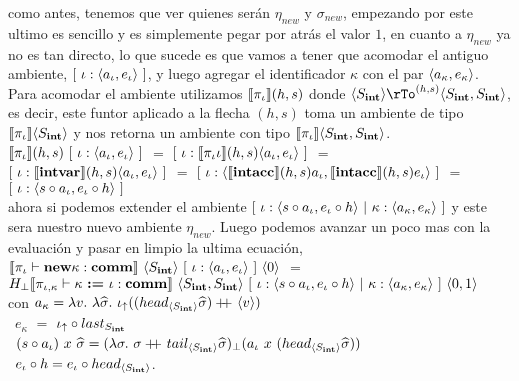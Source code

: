 como antes, tenemos que ver quienes ser\'an $\eta_{new}$ y $\sigma_{new}$, empezando por
este ultimo es sencillo y es simplemente pegar por atr\'as el valor $1$, en cuanto a
$\eta_{new}$ ya no es tan directo, lo que sucede es que vamos a tener que acomodar el
antiguo ambiente, $[ \ \iota : \langle a_\iota,e_\iota \rangle \ ]$, y luego agregar
el identificador $\kappa$ con el par $\langle a_\kappa,e_\kappa \rangle$.\\
Para acomodar el ambiente utilizamos 
$\llbracket \pi_\iota \rrbracket(h,s)$ donde $\lrangles{S_\intt} \rTo^{(h,s)} \lrangles{S_\intt,S_\intt}$,
es decir, este funtor aplicado a la flecha $(h,s)$ toma un ambiente de tipo
$\llbracket \pi_\iota \rrbracket\langle S_{\textbf{int}} \rangle$ y nos retorna un ambiente con tipo 
$\llbracket \pi_\iota \rrbracket\langle S_{\textbf{int}},S_{\textbf{int}} \rangle$.\\

$\llbracket \pi_\iota \rrbracket(h,s) \ [ \ \iota : \langle a_\iota,e_\iota \rangle \ ]$ $=$
$[ \ \iota : \llbracket \pi_\iota \iota \rrbracket(h,s) \langle a_\iota,e_\iota \rangle \ ]$ $=$\\

\indent
$[ \ \iota : \llbracket \textbf{intvar} \rrbracket(h,s) \langle a_\iota,e_\iota \rangle \ ]$ $=$
$[ \ \iota : \langle \llbracket \textbf{intacc} \rrbracket(h,s) a_\iota,\llbracket \textbf{intacc} \rrbracket(h,s)e_\iota \rangle \ ]$ $=$\\

\indent
$[ \ \iota : \langle s \circ a_\iota,e_\iota \circ h \rangle \ ]$\\

ahora si podemos extender el ambiente 
$[ \ \iota : \lrangles{s \circ a_\iota,e_\iota \circ h} \ | \
	\kappa : \lrangles{a_\kappa,e_\kappa}\ ]$ y este sera nuestro nuevo ambiente $\eta_{new}$.
Luego podemos avanzar un poco mas con la evaluaci\'on y pasar en limpio la ultima ecuaci\'on,\\

\noindent
$\semBrcks{\pi_\iota \vdash \cnew \kappa : \commt}
	\ \lrangles{S_\intt} \ 
	[ \ \iota : \lrangles{a_\iota,e_\iota} \ ] \ \lrangles{0}$ $=$ \\
	\indent 
	$H_{\bot} 
	\llbracket \pi_{\iota,\kappa} \vdash \kappa \ \textbf{:=} \ \iota: \textbf{comm} \rrbracket
		\ \langle S_{\textbf{int}},S_{\textbf{int}} \rangle
		\ [ \ \iota : \langle s \circ a_\iota,e_\iota \circ h \rangle \ | \
			\kappa : \langle a_\kappa,e_\kappa \rangle\ ] 
		\ \langle 0,1 \rangle$\\

con $a_\kappa = \lambda v. \ \lambda \widehat{\sigma} . \ \iota_{\uparrow} 
				((head_{\langle S_{\textbf{int}} \rangle} \widehat{\sigma}) +\kern-1.3ex+\kern0.8ex \langle v \rangle)$\\
\indent \indent \ 
	$e_\kappa$ $=$ $ \iota_{\uparrow} \circ last_{S_{\textbf{int}}}$\\
\indent \indent \ 
	$(s \circ a_\iota) \ x \ \widehat{\sigma} = 
		(\lambda \sigma . \ \sigma +\kern-1.3ex+\kern0.8ex tail_{\langle S_{\textbf{int}} \rangle}\widehat{\sigma})_{\bot} 
			(a_\iota \ x \ (head_{\langle S_{\textbf{int}} \rangle} \widehat{\sigma}))$\\
\indent \indent \ 
	$e_\iota \circ h = e_\iota \circ head_{\langle S_{\textbf{int}} \rangle}$.\\
	
